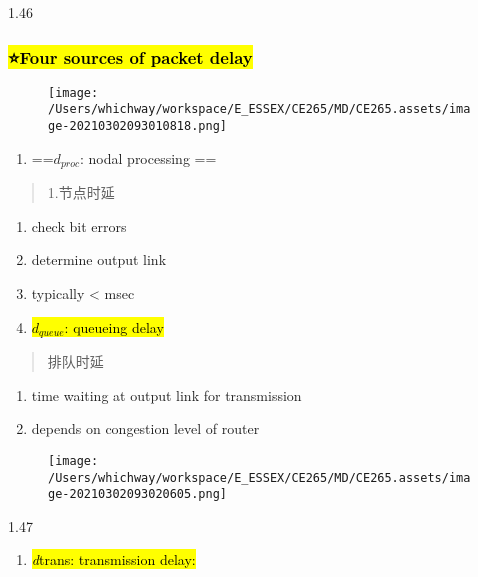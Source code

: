 \documentclass[
]{article}
\begin{document}
1.46

\hypertarget{four-sources-of-packet-delay}{%
\subsubsection{\texorpdfstring{\hl{⭐️Four sources of packet
delay}}{⭐️Four sources of packet delay}}\label{four-sources-of-packet-delay}}

\begin{figure}
\centering
\texttt{[image: /Users/whichway/workspace/E\_ESSEX/CE265/MD/CE265.assets/image-20210302093010818.png]}
\caption{}
\end{figure}

\begin{enumerate}
\def\labelenumi{\arabic{enumi}.}
\item
  ==\(d_{proc}\): nodal processing ==
\end{enumerate}

\begin{quote}
1.节点时延
\end{quote}

\begin{enumerate}
\def\labelenumi{\arabic{enumi}.}
\item
  check bit errors
\item
  determine output link
\item
  typically \textless{} msec
\item
  \hl{\(d_{queue}\): queueing delay}
\end{enumerate}

\begin{quote}
排队时延
\end{quote}

\begin{enumerate}
\def\labelenumi{\arabic{enumi}.}
\item
  time waiting at output link for transmission
\item
  depends on congestion level of router
\end{enumerate}

\begin{figure}
\centering
\texttt{[image: /Users/whichway/workspace/E\_ESSEX/CE265/MD/CE265.assets/image-20210302093020605.png]}
\caption{}
\end{figure}

1.47

\begin{enumerate}
\def\labelenumi{\arabic{enumi}.}
\item
  \hl{\emph{d}trans: transmission delay:}
\end{enumerate}
\end{document}
